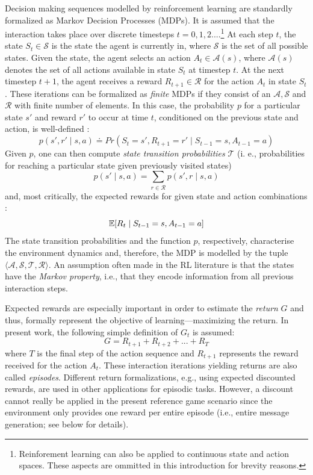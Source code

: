 Decision making sequences modelled by reinforcement learning are standardly formalized as Markov Decision Processes (MDPs). 
It is assumed that the interaction takes place over discrete timesteps $t = 0,1,2 ...$.\footnote{Reinforement learning can also be applied to continuous state and action spaces. These aspects are ommitted in this introduction for brevity reasons.} At each step $t$, the state $S_t \in \mathcal{S}$ is the state the agent is currently in, where $\mathcal{S}$ is the set of all possible states. Given the state, the agent selects an action $A_t \in \mathcal{A}(s)$, where $\mathcal{A}(s)$ denotes the set of all actions available in state $S_t$ at timestep $t$. At the next timestep $t+1$, the agent receives a reward $R_{t+1} \in \mathcal{R}$ for the action $A_t$ in state $S_t$. These iterations can be formalized as \textit{finite} MDPs if they consist of an $\mathcal{A}, \mathcal{S}$ and $\mathcal{R}$ with finite number of elements. In this case, the probability $p$ for a particular state $s'$ and reward $r'$ to occur at time $t$, conditioned on the previous state and action, is well-defined \parencite[][p. 48]{sutton2018reinforcement}:  
\begin{equation}
p(s', r' \mid s, a) \doteq Pr(S_t = s', R_{t+1} = r' \mid S_{t-1} = s, A_{t-1} = a)
\end{equation}
Given $p$, one can then compute \textit{state transition probabilities} $\mathcal{T}$ (i. e., probabilities for reaching a particular state given previously visited states) 
\begin{equation}
p(s' \mid s, a) = \sum_{r \in \mathcal{R} } p(s', r \mid s, a)
\end{equation}
and, most critically, the expected rewards for given state and action combinations \parencite[][p. 49]{sutton2018reinforcement}: 
\begin{equation}
\operatorname*{\mathbb{E}} [R_t \mid S_{t-1}=s, A_{t-1}=a]
\end{equation}
The state transition probabilities and the function $p$, respectively, characterise the environment dynamics and, therefore, the MDP is modelled by the tuple $\langle \mathcal{A}, \mathcal{S}, \mathcal{T}, \mathcal{R} \rangle $. An assumption often made in the RL literature is that the states have the \textit{Markov property}, i.e., that they encode information from all previous interaction steps.

Expected rewards are especially important in order to estimate the \textit{return} $G$ and thus, formally represent the objective of learning---maximizing the return. In present work, the following simple definition of $G_t$ is assumed: 
\begin{equation}
G = R_{t+1} + R_{t+2} + ... + R_T
\end{equation}
where $T$ is the final step of the action sequence and $R_{t+1}$ represents the reward received for the action $A_t$. These interaction iterations yielding returns are also called \textit{episodes}. Different return formalizations, e.g., using expected discounted rewards, are used in other applications for episodic tasks. However, a discount cannot really be applied in the present reference game scenario since the environment only provides one reward per entire episode (i.e., entire message generation; see below for details).

